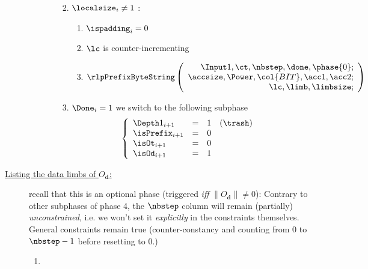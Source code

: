 \begin{description}
\begin{enumerate}[resume]
\begin{enumerate}
\begin{enumerate}
\begin{enumerate}
\begin{itemize}
										\end{itemize}
								\end{enumerate}
							\item \If $\localsize_{i} \neq 1$ \Then:
								\begin{enumerate}
									\item $\ispadding_{i}=0$
									\item $\lc$ is counter-incrementing
									\item 
										\[
											\rlpPrefixByteString
											\left( \begin{array}{r}
												\Input1,
												\ct,
												\nbstep,
												\done,
												\phase{0}; \\
												\accsize,
												\Power,
												\col{BIT},
												\acc1,
												\acc2; \\
												\lc,
												\limb,
												\limbsize; \\
											\end{array} \right)
										\]
								\end{enumerate}
							\item \If $\Done_{i}=1$ \Then we switch to the following subphase
								\[
									\left\{ \begin{array}{lclr}
										\Depth 1_{i + 1}   & = & 1 & (\trash) \\
										\isPrefix_{i + 1}  & = & 0 &          \\
										\isOt_{i + 1}      & = & 0 &          \\
										\isOd_{i + 1}      & = & 1 &          \\
									\end{array} \right.
								\]
						\end{enumerate}
					\end{enumerate}
				\end{enumerate}
			\item[\underline{Listing the data limbs of $O_{\mathbf{d}}$:}] recall that this is an optional phase (triggered \emph{iff} $\|O_\textbf{d}\|\neq0$):
				\saNote{} Contrary to other subphases of phase 4, the $\nbstep$ column will remain (partially) \emph{unconstrained}, i.e. we won't set it \emph{explicitly} in the constraints themselves. General constraints remain true (counter-constancy and \ct{} counting from $0$ to $\nbstep - 1$ before resetting to $0$.)
				\begin{enumerate}[resume]    
					\item \If %

\end{enumerate}
\end{description}
